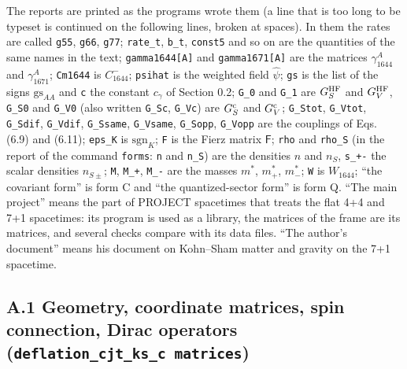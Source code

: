 \documentclass[
  10pt,
]{article}
\begin{document}
The reports are printed as the programs wrote them (a line that is too
long to be typeset is continued on the following lines, broken at
spaces). In them the rates are called \texttt{g55}, \texttt{g66},
\texttt{g77}; \texttt{rate\_t}, \texttt{b\_t}, \texttt{const5} and so on
are the quantities of the same names in the text;
\texttt{gamma1644{[}A{]}} and \texttt{gamma1671{[}A{]}} are the matrices
\(\gamma_{1644}^A\) and \(\gamma_{1671}^A\); \texttt{Cm1644} is
\(C^-_{1644}\); \texttt{psihat} is the weighted field \(\hat\psi\);
\texttt{gs} is the list of the signs \(\mathrm{gs}_{AA}\) and \texttt{c}
the constant \(c_\gamma\) of Section 0.2; \texttt{G\_0} and
\texttt{G\_1} are \(G_S^{\rm HF}\) and \(G_V^{\rm HF}\), \texttt{G\_S0}
and \texttt{G\_V0} (also written \texttt{G\_Sc}, \texttt{G\_Vc}) are
\(G_S^{\rm c}\) and \(G_V^{\rm c}\); \texttt{G\_Stot}, \texttt{G\_Vtot},
\texttt{G\_Sdif}, \texttt{G\_Vdif}, \texttt{G\_Ssame},
\texttt{G\_Vsame}, \texttt{G\_Sopp}, \texttt{G\_Vopp} are the couplings
of Eqs. (6.9) and (6.11); \texttt{eps\_K} is \(\mathrm{sgn}_K\);
\texttt{F} is the Fierz matrix \(\mathsf F\); \texttt{rho} and
\texttt{rho\_S} (in the report of the command \texttt{forms}: \texttt{n}
and \texttt{n\_S}) are the densities \(n\) and \(n_S\), \texttt{s\_+-}
the scalar densities \(n_{S\pm}\); \texttt{M}, \texttt{M\_+},
\texttt{M\_-} are the masses \(m^*\), \(m^*_+\), \(m^*_-\); \texttt{W}
is \(W_{1644}\); ``the covariant form'' is form C and ``the
quantized-sector form'' is form Q. ``The main project'' means the part
of PROJECT spacetimes that treats the flat 4+4 and 7+1 spacetimes: its
program is used as a library, the matrices of the frame are its
matrices, and several checks compare with its data files. ``The author's
document'' means his document on Kohn--Sham matter and gravity on the
7+1 spacetime.

\hypertarget{a.1-geometry-coordinate-matrices-spin-connection-dirac-operators-deflation_cjt_ks_c-matrices}{%
\subsection{\texorpdfstring{A.1 Geometry, coordinate matrices, spin
connection, Dirac operators
(\texttt{deflation\_cjt\_ks\_c\ matrices})}{A.1 Geometry, coordinate matrices, spin connection, Dirac operators (deflation\_cjt\_ks\_c matrices)}}\label{a.1-geometry-coordinate-matrices-spin-connection-dirac-operators-deflation_cjt_ks_c-matrices}}
\end{document}
